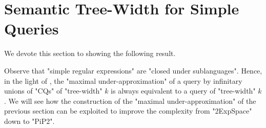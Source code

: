 \section{Semantic Tree-Width for Simple Queries}
\label{sec:sre}

We devote this section to showing the following result.

\thmSemTwSREpitwo 

Observe that "simple regular expressions" are "closed under sublanguages". Hence, in the light of
, the "maximal under-approximation" of a {\UCRPQSRE} query by infinitary unions of "CQs" of "tree-width" $k$ is always equivalent to a {\UCRPQSRE} query  of "tree-width" $k$. We will see how the construction of the "maximal under-approximation" of the previous section can be exploited to improve the complexity from "2ExpSpace" down to "PiP2".

